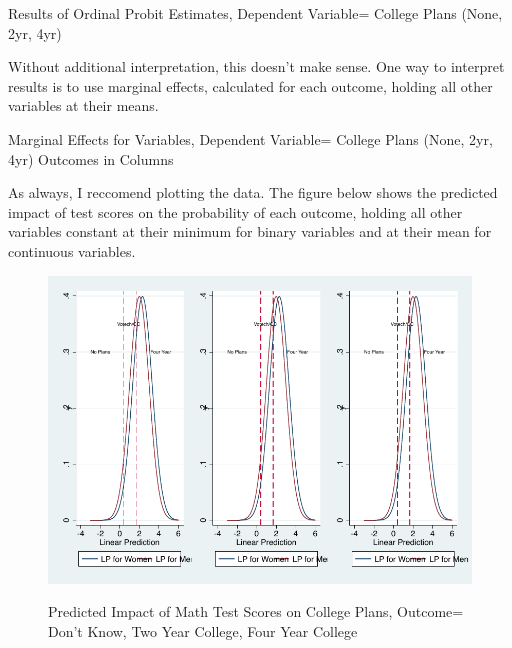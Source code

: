 \documentclass[12 pt]{article}
\begin{document}
\begin{table}
  \centering
  \caption{Results of Ordinal Probit Estimates, Dependent Variable= College Plans (None, 2yr, 4yr)}
   \begin{footnotesize}


  \label{tab:order}
\end{footnotesize}
\end{table}

\clearpage
Without additional interpretation, this doesn't make sense. One way to
interpret results is to use marginal effects, calculated for each
outcome, holding all other variables at their means. 


\begin{table}
  \centering
  \caption{Marginal Effects for Variables, Dependent Variable= College
    Plans (None, 2yr, 4yr) Outcomes in Columns}
   \begin{footnotesize}


  \label{tab:order_marg}
\end{footnotesize}
\end{table}

\clearpage


As always, I reccomend plotting the data. The figure below shows the predicted
impact of test scores on the probability of each outcome, holding all
other variables constant at their minimum for binary variables and at
their mean for continuous variables.

\begin{figure}
  \centering
  
  \caption{Predicted Impact of Math Test Scores on College Plans,
    Outcome= Don't Know, Two Year College, Four Year College}
\includegraphics[width=\textwidth]{order}
  \label{fig:order}
\end{figure}
\end{document}
